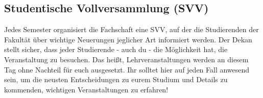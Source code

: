 \subsection{Studentische Vollversammlung (SVV)}
Jedes Semester organisiert die Fachschaft eine SVV, auf der die 
Studierenden der Fakultät über wichtige Neuerungen jeglicher Art 
informiert werden. Der Dekan stellt sicher, dass jeder Studierende - 
auch du - die Möglichkeit hat, die Veranstaltung zu besuchen. Das heißt, 
Lehrveranstaltungen werden an diesem Tag ohne Nachteil für euch 
ausgesetzt.\doublebreak
Ihr solltet hier auf jeden Fall anwesend sein, um die neusten Entscheidungen zu eurem Studium und Details zu
kommenden, wichtigen Veranstaltungen zu erfahren!